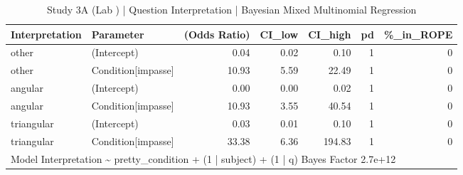 \begin{table}

\caption{Study 3A (Lab ) | Question Interpretation | Bayesian Mixed Multinomial Regression}
\centering
\begin{tabular}[t]{l|l|r|r|r|r|r}
\hline
Interpretation & Parameter & (Odds Ratio) & CI\_low & CI\_high & pd & \%\_in\_ROPE\\
\hline
other & (Intercept) & 0.04 & 0.02 & 0.10 & 1 & 0\\
\hline
other & Condition[impasse] & 10.93 & 5.59 & 22.49 & 1 & 0\\
\hline
angular & (Intercept) & 0.00 & 0.00 & 0.02 & 1 & 0\\
\hline
angular & Condition[impasse] & 10.93 & 3.55 & 40.54 & 1 & 0\\
\hline
triangular & (Intercept) & 0.03 & 0.01 & 0.10 & 1 & 0\\
\hline
triangular & Condition[impasse] & 33.38 & 6.36 & 194.83 & 1 & 0\\
\hline
\multicolumn{7}{l}{\rule{0pt}{1em}Model Interpretation \textasciitilde{}  pretty\_condition + (1 | subject) + (1 | q) Bayes Factor  2.7e+12}\\
\end{tabular}
\end{table}
